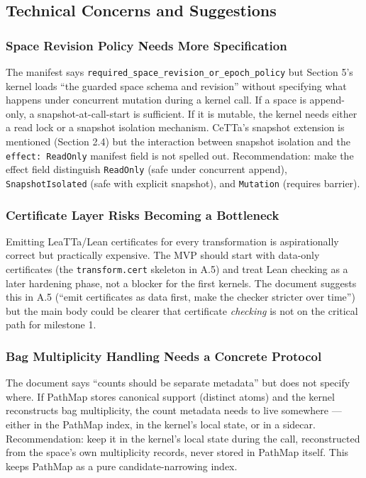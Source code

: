 \documentclass[11pt]{article}
\begin{document}
\subsection{Technical Concerns and Suggestions}

\subsubsection{Space Revision Policy Needs More Specification}

The manifest says \texttt{required\_space\_revision\_or\_epoch\_policy} but Section 5's kernel loads ``the guarded space schema and revision'' without specifying what happens under concurrent mutation during a kernel call. If a space is append-only, a snapshot-at-call-start is sufficient. If it is mutable, the kernel needs either a read lock or a snapshot isolation mechanism. CeTTa's snapshot extension is mentioned (Section 2.4) but the interaction between snapshot isolation and the \texttt{effect: ReadOnly} manifest field is not spelled out. Recommendation: make the effect field distinguish \texttt{ReadOnly} (safe under concurrent append), \texttt{SnapshotIsolated} (safe with explicit snapshot), and \texttt{Mutation} (requires barrier).

\subsubsection{Certificate Layer Risks Becoming a Bottleneck}

Emitting LeaTTa/Lean certificates for every transformation is aspirationally correct but practically expensive. The MVP should start with data-only certificates (the \texttt{transform.cert} skeleton in A.5) and treat Lean checking as a later hardening phase, not a blocker for the first kernels. The document suggests this in A.5 (``emit certificates as data first, make the checker stricter over time'') but the main body could be clearer that certificate \textit{checking} is not on the critical path for milestone 1.

\subsubsection{Bag Multiplicity Handling Needs a Concrete Protocol}

The document says ``counts should be separate metadata'' but does not specify where. If PathMap stores canonical support (distinct atoms) and the kernel reconstructs bag multiplicity, the count metadata needs to live somewhere --- either in the PathMap index, in the kernel's local state, or in a sidecar. Recommendation: keep it in the kernel's local state during the call, reconstructed from the space's own multiplicity records, never stored in PathMap itself. This keeps PathMap as a pure candidate-narrowing index.
\end{document}
